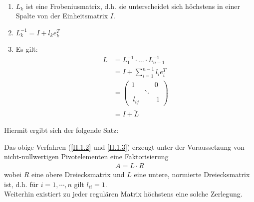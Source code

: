 \begin{Leme}\label{2.1.12}~
  \begin{enumerate}[1.]
  \item $L_k$ ist eine Frobeniusmatrix, d.h. sie unterscheidet sich höchstens
    in einer Spalte von der Einheitsmatrix $I$.
  \item $L_k^{-1} = I + l_ke_{k}^T$
  \item Es gilt:
    \begin{align}
      L &= L_1^{-1} \cdot \dotsc \cdot L_{n-1}^{-1}  
          \label{II.1.13}
      \\ \nonumber
        & = I + \sum_{i=1}^{n-1} l_i e_i^T \\ \nonumber
        &= \begin{pmatrix}
          1 && 0 ~ \\
          &\ddots& \\
          ~l_{ij} && ~1
        \end{pmatrix} \\ \nonumber
        &= I+ \widetilde{L}
    \end{align}
  \end{enumerate}
\end{Leme}
Hiermit ergibt sich der folgende Satz: 

\begin{Satze}
  Das obige Verfahren (\eqref{II.1.2} und \eqref{II.1.3}) erzeugt unter der Voraussetzung
  von nicht-nullwertigen Pivotelementen eine Faktorisierung
  \begin{align*}
    A= L\cdot R 
  \end{align*}
  wobei $R$ eine obere Dreiecksmatrix und $L$ eine untere, normierte Dreiecksmatrix ist,
  d.h. für $i=1, \cdots , n$ gilt $l_{ii}= 1$. \\
  Weiterhin existiert zu jeder regulären Matrix höchstens eine solche Zerlegung.
\end{Satze}

